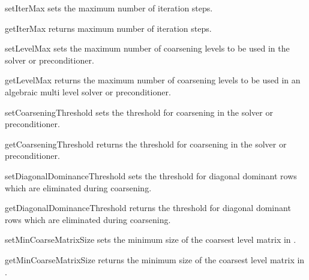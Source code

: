 \begin{methoddesc}[SolverOptions]{setIterMax}{}
sets the maximum number of iteration steps.
\end{methoddesc}

\begin{methoddesc}[SolverOptions]{getIterMax}{}
returns maximum number of iteration steps.
\end{methoddesc}

\begin{methoddesc}[SolverOptions]{setLevelMax}{}
sets the maximum number of coarsening levels to be used in the \AMG solver or
preconditioner.
\end{methoddesc}

\begin{methoddesc}[SolverOptions]{getLevelMax}{}
returns the maximum number of coarsening levels to be used in an algebraic
multi level solver or preconditioner.
\end{methoddesc}

\begin{methoddesc}[SolverOptions]{setCoarseningThreshold}{}
sets the threshold for coarsening in the \AMG solver or preconditioner.
\end{methoddesc}

\begin{methoddesc}[SolverOptions]{getCoarseningThreshold}{}
returns the threshold for coarsening in the \AMG solver or preconditioner.
\end{methoddesc}

\begin{methoddesc}[SolverOptions]{setDiagonalDominanceThreshold}{}
sets the threshold for diagonal dominant rows which are eliminated during \AMG  coarsening.
\end{methoddesc}

\begin{methoddesc}[SolverOptions]{getDiagonalDominanceThreshold}{}
returns the threshold for diagonal dominant rows which are eliminated during \AMG  coarsening.
\end{methoddesc}

\begin{methoddesc}[SolverOptions]{setMinCoarseMatrixSize}{}
sets the minimum size of the coarsest level matrix in \AMG.
\end{methoddesc}

\begin{methoddesc}[SolverOptions]{getMinCoarseMatrixSize}{}
returns the minimum size of the coarsest level matrix in \AMG.
\end{methoddesc}

